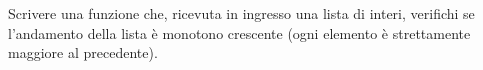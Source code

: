 \begin{Exercise}[label={ex:monotona}]
    Scrivere una funzione che, ricevuta in ingresso una lista di interi, verifichi
    se l'andamento della lista è monotono crescente (ogni elemento è strettamente maggiore al precedente).
\end{Exercise}

\begin{Answer}[ref={ex:monotona}]
  	
\end{Answer}